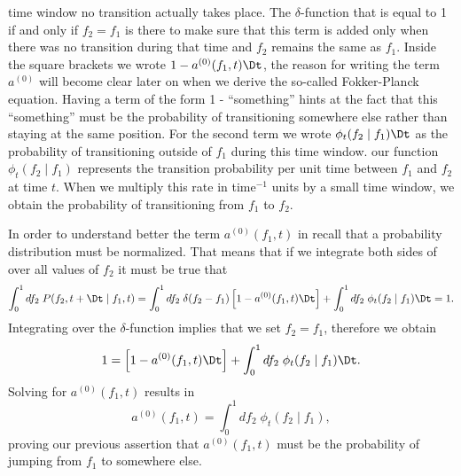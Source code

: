 time window no transition actually takes place. The $\delta$-function that is
equal to 1 if and only if $f_2 = f_1$ is there to make sure that this term is
added only when there was no transition during that time and $f_2$ remains the
same as $f_1$. Inside the square brackets we wrote $1 - a^{(0)}(f_1, t) \Dt$,
the reason for writing the term $a^{(0)}$ will become clear later on when we
derive the so-called Fokker-Planck equation. Having a term of the form 1 -
``something'' hints at the fact that this ``something'' must be the probability
of transitioning somewhere else rather than staying at the same position. For
the second term we wrote $\phi_t(f_2 \mid f_1)\Dt$ as the probability of
transitioning outside of $f_1$ during this time window. our function $\phi_t(f_2
\mid f_1)$ represents the transition probability per unit time between $f_1$ and
$f_2$ at time $t$. When we multiply this rate in time$^{-1}$ units by a small
time window, we obtain the probability of transitioning from $f_1$ to $f_2$.

In order to understand better the term $a^{(0)}(f_1, t)$ in
 recall that a probability distribution must be
normalized. That means that if we integrate both sides of
 over all values of $f_2$ it must be true that
\begin{equation}
  \int_0^1 df_2 \; P(f_2, t + \Dt \mid f_1, t) =
  \int_0^1 df_2 \; \delta(f_2 - f_1) \left[ 1 - a^{(0)}(f_1, t) \Dt \right]
  + \int_0^1 df_2 \; \phi_t(f_2 \mid f_1)\Dt
  = 1.
\end{equation}
Integrating over the $\delta$-function implies that we set $f_2 = f_1$,
therefore we obtain
\begin{equation}
  1 = \left[  1 - a^{(0)}(f_1, t) \Dt\right] +
  \int_0^1 df_2 \; \phi_t(f_2 \mid f_1)\Dt.
\end{equation}
Solving for $a^{(0)}(f_1, t)$ results in
\begin{equation}
  a^{(0)}(f_1, t) = \int_0^1 df_2 \; \phi_t(f_2 \mid f_1),
  \label{eq_a0}
\end{equation}
proving our previous assertion that $a^{(0)}(f_1, t)$ must be the
probability of jumping from $f_1$ to somewhere else.

